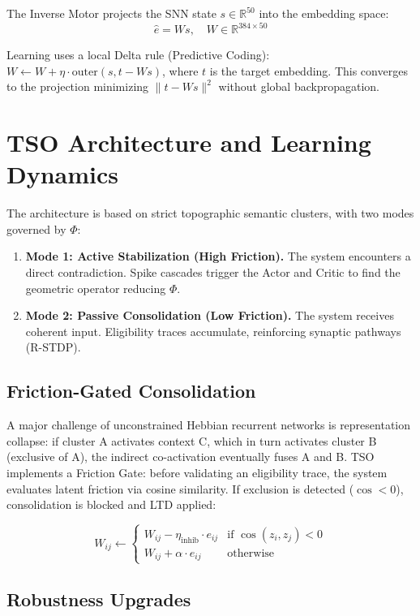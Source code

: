 \documentclass{article}
\begin{document}
The Inverse Motor projects the SNN state $s \in \mathbb{R}^{50}$ into the embedding space:
$$\hat{e} = W s, \quad W \in \mathbb{R}^{384 \times 50}$$

Learning uses a local Delta rule (Predictive Coding): $W \leftarrow W + \eta \cdot \text{outer}(s, t - W s)$, where $t$ is the target embedding. This converges to the projection minimizing $\|t - W s\|^2$ without global backpropagation.

\section{TSO Architecture and Learning Dynamics}

The architecture is based on strict topographic semantic clusters, with two modes governed by $\Phi$:

\begin{enumerate}
    \item \textbf{Mode 1: Active Stabilization (High Friction).} The system encounters a direct contradiction. Spike cascades trigger the Actor and Critic to find the geometric operator reducing $\Phi$.
    \item \textbf{Mode 2: Passive Consolidation (Low Friction).} The system receives coherent input. Eligibility traces accumulate, reinforcing synaptic pathways (R-STDP).
\end{enumerate}

\subsection{Friction-Gated Consolidation}

A major challenge of unconstrained Hebbian recurrent networks is representation collapse: if cluster A activates context C, which in turn activates cluster B (exclusive of A), the indirect co-activation eventually fuses A and B. TSO implements a Friction Gate: before validating an eligibility trace, the system evaluates latent friction via cosine similarity. If exclusion is detected ($\cos < 0$), consolidation is blocked and LTD applied:

$$W_{ij} \leftarrow \begin{cases}
W_{ij} - \eta_{\text{inhib}} \cdot e_{ij} & \text{if } \cos(z_i, z_j) < 0 \\
W_{ij} + \alpha \cdot e_{ij} & \text{otherwise}
\end{cases}$$

\subsection{Robustness Upgrades}
\end{document}
